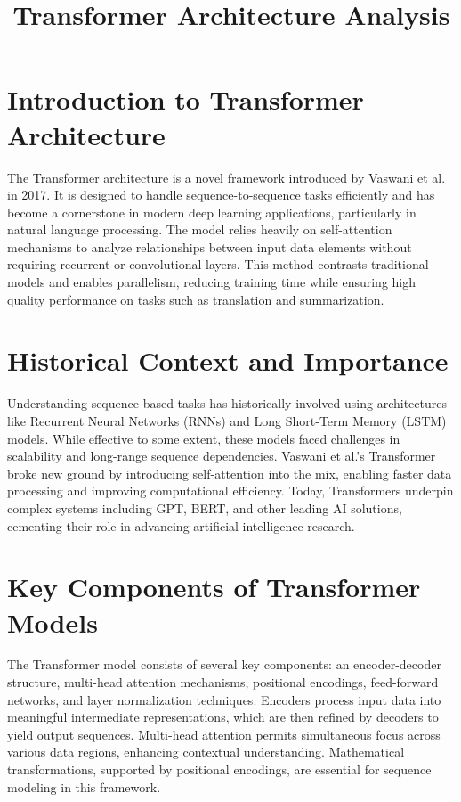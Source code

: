 \documentclass{article}
\title{Transformer Architecture Analysis}
\author{}
\date{}
\begin{document}
\maketitle

\tableofcontents
\newpage

\section{Introduction to Transformer Architecture}
The Transformer architecture is a novel framework introduced by Vaswani et al. in 2017. It is designed to handle sequence-to-sequence tasks efficiently and has become a cornerstone in modern deep learning applications, particularly in natural language processing. The model relies heavily on self-attention mechanisms to analyze relationships between input data elements without requiring recurrent or convolutional layers. This method contrasts traditional models and enables parallelism, reducing training time while ensuring high quality performance on tasks such as translation and summarization.

\section{Historical Context and Importance}
Understanding sequence-based tasks has historically involved using architectures like Recurrent Neural Networks (RNNs) and Long Short-Term Memory (LSTM) models. While effective to some extent, these models faced challenges in scalability and long-range sequence dependencies. Vaswani et al.'s Transformer broke new ground by introducing self-attention into the mix, enabling faster data processing and improving computational efficiency. Today, Transformers underpin complex systems including GPT, BERT, and other leading AI solutions, cementing their role in advancing artificial intelligence research.

\section{Key Components of Transformer Models}
The Transformer model consists of several key components: an encoder-decoder structure, multi-head attention mechanisms, positional encodings, feed-forward networks, and layer normalization techniques. Encoders process input data into meaningful intermediate representations, which are then refined by decoders to yield output sequences. Multi-head attention permits simultaneous focus across various data regions, enhancing contextual understanding. Mathematical transformations, supported by positional encodings, are essential for sequence modeling in this framework.
\end{document}
